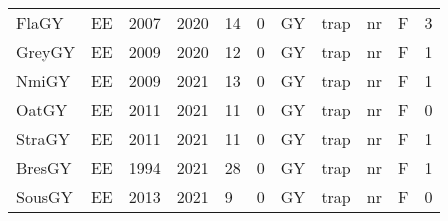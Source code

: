 \begin{table}[htbp]
\begin{tabular}{p{1cm}p{1cm}p{1cm}p{1cm}p{0.8cm}p{0.8cm}p{1cm}p{2cm}p{2cm}p{1cm}p{1cm}}
  FlaGY & EE & 2007 & 2020 & 14 & 0 & GY & trap & nr & F & 3 \\ 
  GreyGY & EE & 2009 & 2020 & 12 & 0 & GY & trap & nr & F & 1 \\ 
  NmiGY & EE & 2009 & 2021 & 13 & 0 & GY & trap & nr & F & 1 \\ 
  OatGY & EE & 2011 & 2021 & 11 & 0 & GY & trap & nr & F & 0 \\ 
  StraGY & EE & 2011 & 2021 & 11 & 0 & GY & trap & nr & F & 1 \\ 
  BresGY & EE & 1994 & 2021 & 28 & 0 & GY & trap & nr & F & 1 \\ 
  SousGY & EE & 2013 & 2021 & 9 & 0 & GY & trap & nr & F & 0 \\ 
   \hline
\end{tabular}
\end{table}
